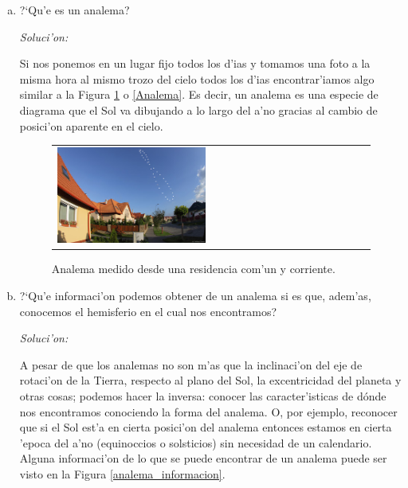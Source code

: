 \documentclass{article}
\begin{document}
\begin{enumerate} [a)]

\item ?`Qu'e es un analema?

\emph{Soluci'on:}

Si nos ponemos en un lugar fijo todos los d'ias y tomamos una foto a la misma hora al mismo trozo del cielo todos los d'ias encontrar'iamos algo similar a la Figura \ref{analema_casa} o \ref{Analema}. Es decir, un analema es una especie de diagrama que el Sol va dibujando a lo largo del a'no gracias al cambio de posici'on aparente en el cielo.

\begin{figure}[!ht]
\begin{center}
\begin{tabular}{ll}
  \includegraphics[width=0.5\textwidth]{analema_casa.jpg} 
\end{tabular}
\caption{{\small Analema medido desde una residencia com'un y corriente.}}\label{analema_casa}
\end{center} 
\end{figure}

\newpage

\item ?`Qu'e informaci'on podemos obtener de un analema si es que, adem'as, conocemos el hemisferio en el cual nos encontramos?

\emph{Soluci'on:}

A pesar de que los analemas no son m'as que la inclinaci'on del eje de rotaci'on de la Tierra, respecto al plano del Sol, la excentricidad del planeta y otras cosas; podemos hacer la inversa: conocer las caracter'isticas de dónde nos encontramos conociendo la forma del analema. O, por ejemplo, reconocer que si el Sol est'a en cierta posici'on del analema entonces estamos en cierta 'epoca del a'no (equinoccios o solsticios) sin necesidad de un calendario. Alguna informaci'on de lo que se puede encontrar de un analema puede ser visto en la Figura \ref{analema_informacion}.


\end{enumerate}
\end{document}
